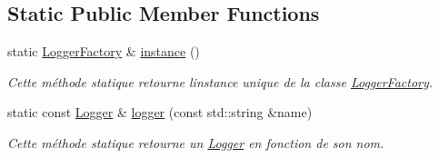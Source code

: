 \subsection*{Static Public Member Functions}
\begin{DoxyCompactItemize}
\item 
static \hyperlink{classlogs_1_1LoggerFactory}{Logger\+Factory} \& \hyperlink{classlogs_1_1LoggerFactory_a90478b91d7af2ef8841ded21e3521f69}{instance} ()
\begin{DoxyCompactList}\small\item\em Cette méthode statique retourne l\textquotesingle{}instance unique de la classe \hyperlink{classlogs_1_1LoggerFactory}{Logger\+Factory}. \end{DoxyCompactList}\item 
static const \hyperlink{classlogs_1_1Logger}{Logger} \& \hyperlink{classlogs_1_1LoggerFactory_a82585b5de73e471e06cafdccc3b3721e}{logger} (const std\+::string \&name)
\begin{DoxyCompactList}\small\item\em Cette méthode statique retourne un \hyperlink{classlogs_1_1Logger}{Logger} en fonction de son nom. \end{DoxyCompactList}\end{DoxyCompactItemize}
